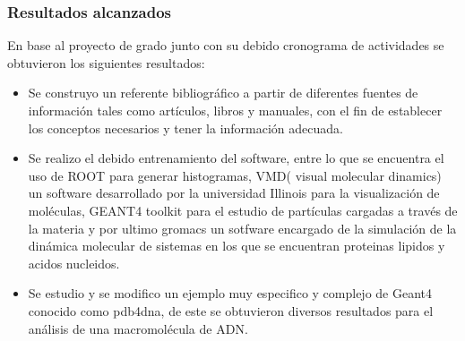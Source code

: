 \subsubsection{Resultados alcanzados}
En base al proyecto de grado junto con su debido cronograma de actividades se obtuvieron los siguientes resultados:
\begin{itemize}
  \item Se construyo un referente bibliográfico
a partir de diferentes fuentes de información tales como
artículos, libros y manuales, con el fin de establecer los conceptos necesarios y tener la información adecuada.
\item Se realizo el debido entrenamiento del software, entre lo que se encuentra el uso de ROOT para generar histogramas, VMD( visual molecular dinamics) un software desarrollado por la universidad Illinois para la visualización de moléculas, GEANT4 toolkit para el estudio de partículas cargadas a través de la materia y por ultimo gromacs un sotfware encargado de la simulación de la dinámica molecular de sistemas en los que se encuentran proteinas lipidos y acidos nucleidos.
\item Se estudio y se modifico un ejemplo muy especifico y complejo de Geant4 conocido como pdb4dna, de este se obtuvieron diversos resultados para el análisis de una macromolécula de ADN.
\end{itemize}
